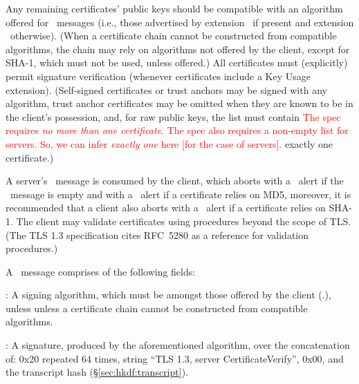 \begin{description}
{  }
  \fi
  Any remaining certificates' public keys should be compatible with an algorithm 
  offered %
  for \Certificate\ messages (i.e., those advertised 
  by extension \TLSsignatureAlgorithmsCert\ if present and extension 
  \TLSsignatureAlgorithms\ otherwise).
  (When a certificate chain cannot be constructed from compatible algorithms, 
  the chain may rely on algorithms not offered by the client, 
  except for SHA-1, which must not be used, unless offered.)
  All certificates must (explicitly) permit signature verification (whenever
  certificates include a Key Usage extension).
  (Self-signed certificates or trust anchors may be signed 
  with any algorithm, trust anchor certificates 
  may be omitted when they are known to be in the client's 
  possession, and, for raw public keys, the list must contain 
  \ifSpecNotes 
  \textcolor{red}{
  The spec requires \emph{no more than one certificate}.
  The spec also requires a non-empty list for servers. 
  So, we can infer \emph{exactly one} here [for the case of servers].
  }
  \fi
  exactly one certificate.)

\end{description}

\noindent
A server's \Certificate\ message is consumed by the client, which aborts
with a \TLSdecodeError\ alert if the \Certificate\ message is empty
and with a \TLSbadCertificate\ alert if a certificate relies on MD5, moreover,
it is recommended that a client also aborts with a \TLSbadCertificate\ alert if
a certificate relies on SHA-1. The client may validate certificates using 
procedures beyond the scope of TLS. (The TLS 1.3 specification
cites RFC~5280 as a reference for validation procedures.)

A \CertificateVerify\ message comprises of the following fields:

\begin{description}

\begin{sloppypar}
\item \TLSalgorithm: A signing algorithm, which must be amongst those
  offered by the client (\ClientHello.\TLSsignatureAlgorithms), unless 
  unless a certificate chain cannot be constructed from compatible algorithms.
\end{sloppypar}
  
\item \TLSsignature: A signature, produced by the aforementioned algorithm, over the concatenation of: 
  0x20 repeated 64 times, string ``TLS 1.3, server CertificateVerify'',
  0x00, and the transcript hash (\S\ref{sec:hkdf:transcript}).

\end{description}

